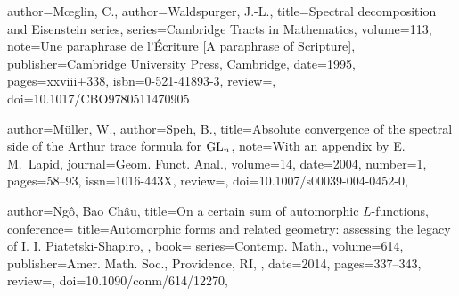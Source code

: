 \documentclass[11pt]{amsart}
\theoremstyle{remark}
\begin{document}
\begin{bibdiv}
\begin{biblist}

        
    {
       author={M{\oe}glin, C.},
       author={Waldspurger, J.-L.},
       title={Spectral decomposition and Eisenstein series},
       series={Cambridge Tracts in Mathematics},
       volume={113},
       note={Une paraphrase de l'\'Ecriture [A paraphrase of Scripture]},
       publisher={Cambridge University Press, Cambridge},
       date={1995},
       pages={xxviii+338},
       isbn={0-521-41893-3},
       review={},
       doi={10.1017/CBO9780511470905}
    }
    
    {
       author={M\"uller, W.},
       author={Speh, B.},
       title={Absolute convergence of the spectral side of the Arthur trace
       formula for ${\rm GL}_n$},
       note={With an appendix by E. M.\ Lapid},
       journal={Geom. Funct. Anal.},
       volume={14},
       date={2004},
       number={1},
       pages={58--93},
       issn={1016-443X},
       review={},
       doi={10.1007/s00039-004-0452-0},
    }
	    
   {
       author={Ng\^o, Bao Ch\^au},
       title={On a certain sum of automorphic $L$-functions},
       conference={
       title={Automorphic forms and related geometry: assessing the legacy of
          I. I. Piatetski-Shapiro},
          },
       book={
          series={Contemp. Math.},
          volume={614},
          publisher={Amer. Math. Soc., Providence, RI},
       },
       date={2014},
       pages={337--343},
       review={},
       doi={10.1090/conm/614/12270},
    }

    

\end{biblist}
\end{bibdiv}
\end{document}
